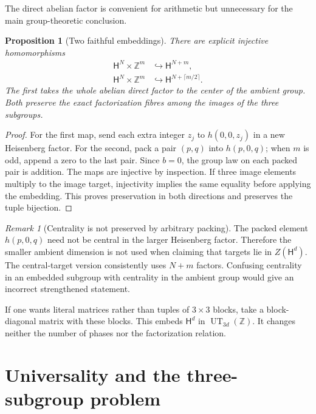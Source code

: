 \documentclass[11pt,letterpaper]{article}
\newtheorem{proposition}[theorem]{Proposition}
\theoremstyle{definition}
\theoremstyle{remark}
\newtheorem{remark}[theorem]{Remark}
\newcommand{\ZZ}{\mathbb Z}
\newcommand{\HH}{\mathsf H}
\begin{document}
The direct abelian factor is convenient for arithmetic but unnecessary for
the main group-theoretic conclusion.

\begin{proposition}[Two faithful embeddings]\label{gts:tp:prop:embedding}
There are explicit injective homomorphisms
\begin{align*}
 \HH^N\times\ZZ^m&\hookrightarrow\HH^{N+m},\\
 \HH^N\times\ZZ^m&\hookrightarrow\HH^{N+\lceil m/2\rceil}.
\end{align*}
The first takes the whole abelian direct factor to the center of the
ambient group. Both preserve the exact factorization fibres among the
images of the three subgroups.
\end{proposition}
\begin{proof}
For the first map, send each extra integer $z_j$ to $h(0,0,z_j)$ in a new
Heisenberg factor. For the second, pack a pair $(p,q)$ into $h(p,0,q)$;
when $m$ is odd, append a zero to the last pair. Since $b=0$, the group law
on each packed pair is addition. The maps are injective by inspection.
If three image elements multiply to the image target, injectivity implies
the same equality before applying the embedding. This proves preservation
in both directions and preserves the tuple bijection.
\end{proof}

\begin{remark}[Centrality is not preserved by arbitrary packing]
The packed element $h(p,0,q)$ need not be central in the larger Heisenberg
factor. Therefore the smaller ambient dimension is not used when claiming
that targets lie in $Z(\HH^d)$. The central-target version consistently uses
$N+m$ factors. Confusing centrality in an embedded subgroup with centrality
in the ambient group would give an incorrect strengthened statement.
\end{remark}

If one wants literal matrices rather than tuples of $3\times3$ blocks, take
a block-diagonal matrix with these blocks. This embeds $\HH^d$ in
$\operatorname{UT}_{3d}(\ZZ)$. It changes neither the number of phases nor
the factorization relation.

\section{Universality and the three-subgroup problem}
\label{gts:tp:sec:universal}
\end{document}

